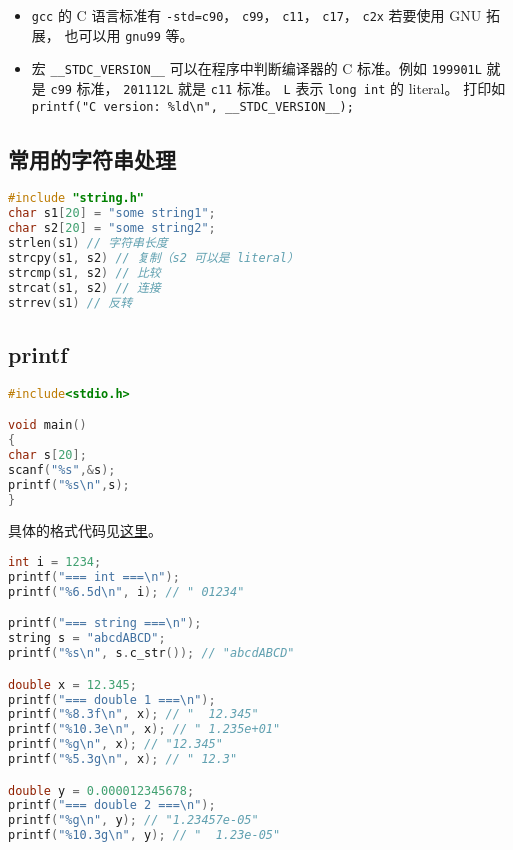 
\begin{itemize}
\item \verb`gcc` 的 C 语言标准有 \verb`-std=c90`， \verb`c99`， \verb`c11`， \verb`c17`， \verb`c2x` 若要使用 GNU 拓展， 也可以用 \verb`gnu99` 等。
\item 宏 \verb`__STDC_VERSION__` 可以在程序中判断编译器的 C 标准。例如 \verb`199901L` 就是 \verb`c99` 标准， \verb`201112L` 就是 \verb`c11` 标准。 \verb`L` 表示 \verb`long int` 的 literal。 打印如 \verb`printf("C version: %ld\n", __STDC_VERSION__);`
\end{itemize}


\subsection{常用的字符串处理}
\begin{lstlisting}[language=cpp]
#include "string.h"
char s1[20] = "some string1";
char s2[20] = "some string2";
strlen(s1) // 字符串长度
strcpy(s1, s2) // 复制（s2 可以是 literal）
strcmp(s1, s2) // 比较
strcat(s1, s2) // 连接
strrev(s1) // 反转
\end{lstlisting}

\subsection{printf}
\begin{lstlisting}[language=cpp]
#include<stdio.h>

void main()
{
char s[20];
scanf("%s",&s);
printf("%s\n",s);
}
\end{lstlisting}
具体的格式代码见\href{https://www.tutorialspoint.com/c_standard_library/c_function_printf.htm}{这里}。

\begin{lstlisting}[language=cpp]
int i = 1234;
printf("=== int ===\n");
printf("%6.5d\n", i); // " 01234"

printf("=== string ===\n");
string s = "abcdABCD";
printf("%s\n", s.c_str()); // "abcdABCD"

double x = 12.345;
printf("=== double 1 ===\n");
printf("%8.3f\n", x); // "  12.345"
printf("%10.3e\n", x); // " 1.235e+01"
printf("%g\n", x); // "12.345"
printf("%5.3g\n", x); // " 12.3"

double y = 0.000012345678;
printf("=== double 2 ===\n");
printf("%g\n", y); // "1.23457e-05"
printf("%10.3g\n", y); // "  1.23e-05"
\end{lstlisting}

